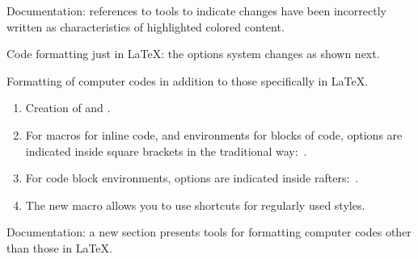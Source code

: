 \documentclass{tutodoc}
\begin{document}
\small

\begin{tdocfix}
	\item Documentation: references to tools to indicate changes have been incorrectly written as characteristics of highlighted colored content.
\end{tdocfix}


\begin{tdocbreak}
	\item Code formatting just in \LaTeX: the options system changes as shown next.
\end{tdocbreak}


\begin{tdocnew}
	\item Formatting of computer codes in addition to those specifically in LaTeX.
	\begin{enumerate}
		\item Creation of  and .

		\item For macros for inline code, and environments for blocks of code,  options are indicated inside square brackets in the traditional way: \,.

		\item For code block environments,  options are indicated inside rafters: \,.

		\item The new macro  allows you to use shortcuts for regularly used  styles.
	\end{enumerate}

	\item Documentation: a new section presents tools for formatting computer codes other than those in LaTeX.
\end{tdocnew}
\end{document}
